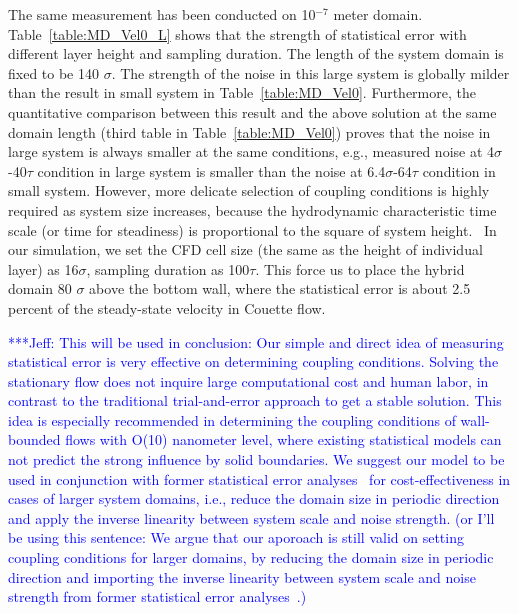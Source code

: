 \documentclass[preprint,12pt]{elsarticle}
\newcommand{\skonote}[1]{ {\textcolor{blue} { ***Jeff: #1 }}}
\newcommand{\skonote}[1]{}
\begin{document}
The same measurement has been conducted on 10$^{-7}$ meter domain. Table~\ref{table:MD_Vel0_L} shows that the strength of statistical error with different layer height and sampling duration. The length of the system domain is fixed to be 140 $\sigma$.
The strength of the noise in this large system is globally milder than the result in small system in Table~\ref{table:MD_Vel0}. Furthermore, the quantitative comparison between this result and the above solution at the same domain length (third table in Table~\ref{table:MD_Vel0}) proves that the noise in large system is always smaller at the same conditions, e.g., measured noise at 4$\sigma$-40$\tau$ condition in large system is smaller than the noise at 6.4$\sigma$-64$\tau$ condition in small system. However, more delicate selection of coupling conditions is highly required as system size increases, because the hydrodynamic characteristic time scale (or time for steadiness) is proportional to the square of system height.~\cite{Hadjicon3} In our simulation, we set the CFD cell size (the same as the height of individual layer) as 16$\sigma$, sampling duration as 100$\tau$. This force us to place the hybrid domain 80 $\sigma$ above the bottom wall, where the statistical error is about 2.5 percent of the steady-state velocity in Couette flow.

\skonote{This will be used in conclusion: Our simple and direct idea of measuring statistical error is very effective on determining coupling conditions. Solving the stationary flow does not inquire large computational cost and human labor, in contrast to the traditional trial-and-error approach to get a stable solution. This idea is especially recommended in determining the coupling conditions of wall-bounded flows with O(10) nanometer level, where existing statistical models can not predict the strong influence by solid boundaries. We suggest our model to be used in conjunction with former statistical error analyses~\cite{Hadjicon3,Time_Mechanism} for cost-effectiveness in cases of larger system domains, i.e., reduce the domain size in periodic direction and apply the inverse linearity between system scale and noise strength. (or I'll be using this sentence: We argue that our aporoach is still valid on setting coupling conditions for larger domains, by reducing the domain size in periodic direction and importing the inverse linearity between system scale and noise strength from former statistical error analyses~\cite{Hadjicon3,Time_Mechanism}.)
}
\end{document}
